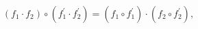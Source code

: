 \begin{equation}
\label{eq_exchange}
  (f_1\cdot f_2)\circ (f_1^\prime\cdot f_2^\prime)
  = (f_1\circ f_1^\prime)\cdot(f_2\circ f_2^\prime),
\end{equation}

